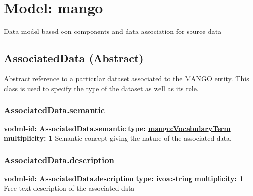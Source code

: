 
%



    
    
    
    
    
    
      

\pagebreak
\section{Model: mango }
  

  Data model based oon components and data association for source data

  \subsection{AssociatedData (Abstract)}
  \label{sect:AssociatedData}
    Abstract reference to a particular dataset associated to the MANGO entity. This class is used to specify the type of the dataset as well as its role.

    \subsubsection{AssociatedData.semantic}
      \textbf{vodml-id: AssociatedData.semantic} \newline
      \textbf{type: \hyperref[sect:VocabularyTerm]{mango:VocabularyTerm}} \newline
      \textbf{multiplicity: 1} \newline 
      Semantic concept giving the nature of the associated data.

    \subsubsection{AssociatedData.description}
      \textbf{vodml-id: AssociatedData.description} \newline
      \textbf{type: \hyperref[sect:ivoa]{ivoa:string}} \newline
      \textbf{multiplicity: 1} \newline 
      Free text description of the associated data

